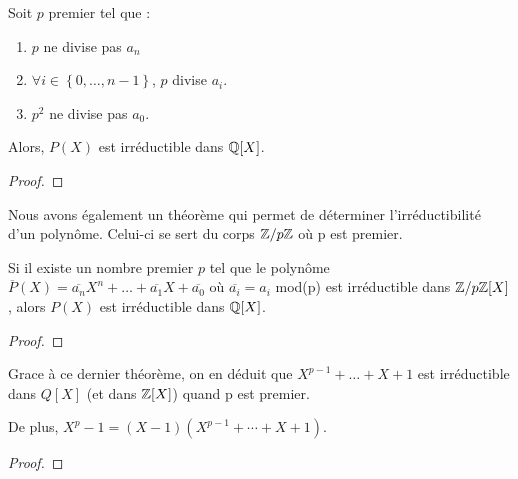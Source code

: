 \begin{theorem} 

	Soit $p$ premier tel que :

	\begin{enumerate}
		\item $p$ ne divise pas $a_{n}$
		\item $\forall i \in \left\{ 0, \ldots, n - 1 \right\}$, $p$ divise
			$a_{i}$.
		\item $p^{2}$ ne divise pas $a_{0}$.
	\end{enumerate}
	\label{critere_E}
	Alors, $P(X)$ est irréductible dans $\mathbb{Q}[X]$.
\end{theorem}

\ifdefined\outputproof
\begin{proof}

\end{proof}
\fi

Nous avons également un théorème qui permet de déterminer l'irréductibilité d'un
polynôme. Celui-ci se sert du corps $\mathbb{Z}/p\mathbb{Z}$ où p est premier.

\begin{theorem}
	Si il existe un nombre premier $p$ tel que le polynôme $\overline{P}(X) =
	\overline{a_{n}}X^{n} + \ldots + \overline{a_{1}}X + \overline{a_{0}}$ où
	$\overline{a_{i}} = a_{i}$ mod(p) est irréductible dans
	$\mathbb{Z}/p\mathbb{Z}[X]$, alors $P(X)$ est irréductible dans $\mathbb{Q}[X]$.
\end{theorem}

\ifdefined\outputproof
\begin{proof}

\end{proof}
\fi

\begin{corollary}
	Grace à ce dernier théorème, on en déduit que $X^{p - 1} + \ldots + X + 1$
	est irréductible dans $Q[X]$ (et dans $\mathbb{Z}[X]$) quand p est premier.

	De plus, $X^{p} - 1 = (X - 1) (X^{p - 1} + \cdots + X + 1)$.
\end{corollary}

\ifdefined\outputproof
\begin{proof}

\end{proof}
\fi


